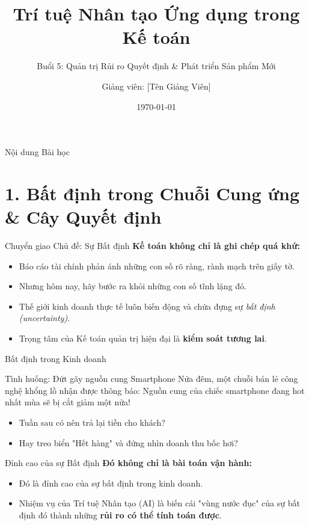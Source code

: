\documentclass[aspectratio=169]{beamer}
\title[TTNT trong Kế toán - Buổi 5]{Trí tuệ Nhân tạo Ứng dụng trong Kế toán}
\subtitle{Buổi 5: Quản trị Rủi ro Quyết định \& Phát triển Sản phẩm Mới}
\author{Giảng viên: [Tên Giảng Viên]}
\institute{Đại học Đông Á}
\date{\today}
\begin{document}
\begin{frame}
    \titlepage
\end{frame}

\begin{frame}{Nội dung Bài học}
    \tableofcontents
\end{frame}

\section{1. Bất định trong Chuỗi Cung ứng \& Cây Quyết định}

\begin{frame}{Chuyển giao Chủ đề: Sự Bất định}
    \textbf{Kế toán không chỉ là ghi chép quá khứ:}
    \begin{itemize}
        \item Báo cáo tài chính phản ánh những con số rõ ràng, rành mạch trên giấy tờ.
        \item Nhưng hôm nay, hãy bước ra khỏi những con số tĩnh lặng đó.
        \item Thế giới kinh doanh thực tế luôn biến động và chứa đựng sự \textit{bất định (uncertainty)}.
        \item Trọng tâm của Kế toán quản trị hiện đại là \textbf{kiểm soát tương lai}.
    \end{itemize}
\end{frame}

\begin{frame}{Bất định trong Kinh doanh}
    \begin{block}{Tình huống: Đứt gãy nguồn cung Smartphone}
        Nửa đêm, một chuỗi bán lẻ công nghệ khổng lồ nhận được thông báo: Nguồn cung của chiếc smartphone đang hot nhất mùa sẽ bị cắt giảm một nửa!
        \begin{itemize}
            \item Tuần sau có nên trả lại tiền cho khách?
            \item Hay treo biển "Hết hàng" và đứng nhìn doanh thu bốc hơi?
        \end{itemize}
    \end{block}
\end{frame}

\begin{frame}{Đỉnh cao của sự Bất định}
    \textbf{Đó không chỉ là bài toán vận hành:}
    \begin{itemize}
        \item Đó là đỉnh cao của sự bất định trong kinh doanh.
        \item Nhiệm vụ của Trí tuệ Nhân tạo (AI) là biến cái "vùng nước đục" của sự bất định đó thành những \textbf{rủi ro có thể tính toán được}.
    \end{itemize}
\end{frame}
\end{document}
